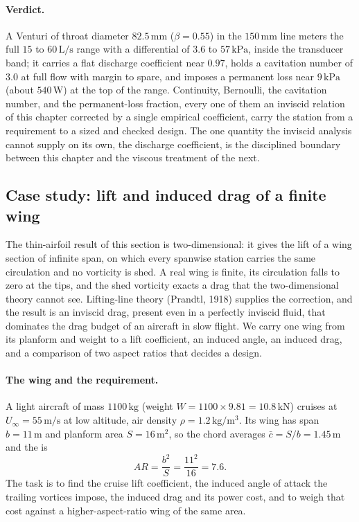 \paragraph{Verdict.} A Venturi of throat diameter $82.5\,\si{
\milli\meter}$ ($\beta = 0.55$) in the $150\,\si{\milli\meter}$ line
meters the full $15$ to $60\,\text{L/s}$ range with a differential of
$3.6$ to $57\,\text{kPa}$, inside the transducer band; it carries a
flat discharge coefficient near $0.97$, holds a cavitation number of
$3.0$ at full flow with margin to spare, and imposes a permanent loss
near $9\,\text{kPa}$ (about $540\,\si{\watt}$) at the top of the range.
Continuity, Bernoulli, the cavitation number, and the permanent-loss
fraction, every one of them an inviscid relation of this chapter
corrected by a single empirical coefficient, carry the station from a
requirement to a sized and checked design. The one quantity the
inviscid analysis cannot supply on its own, the discharge coefficient,
is the disciplined boundary between this chapter and the viscous
treatment of the next.

\subsection{Case study: lift and induced drag of a finite wing}

The thin-airfoil result of this section is two-dimensional: it gives
the lift of a wing section of infinite span, on which every spanwise
station carries the same circulation and no vorticity is shed. A real
wing is finite, its circulation falls to zero at the tips, and the
shed vorticity exacts a drag that the two-dimensional theory cannot
see. Lifting-line theory (Prandtl, 1918) supplies the correction, and
the result is an inviscid drag, present even in a perfectly inviscid
fluid, that dominates the drag budget of an aircraft in slow flight.
We carry one wing from its planform and weight to a lift coefficient,
an induced angle, an induced drag, and a comparison of two aspect
ratios that decides a design.



\paragraph{The wing and the requirement.} A light aircraft of mass
$1100\,\si{\kilogram}$ (weight $W = 1100\times 9.81 =
10.8\,\text{kN}$) cruises at $U_\infty = 55\,\si{\meter\per\second}$
at low altitude, air density $\rho = 1.2\,\si{\kilogram\per\meter
\cubed}$. Its wing has span $b = 11\,\si{\meter}$ and planform area
$S = 16\,\si{\meter}^2$, so the chord averages $\bar c = S/b =
1.45\,\si{\meter}$ and the  is
\[
AR = \frac{b^2}{S} = \frac{11^2}{16} = 7.6.
\]
The task is to find the cruise lift coefficient, the induced angle of
attack the trailing vortices impose, the induced drag and its power
cost, and to weigh that cost against a higher-aspect-ratio wing of the
same area.

